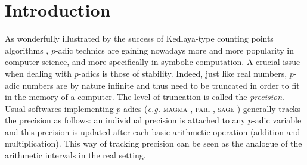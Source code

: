 \documentclass{article}
\begin{document}
\section{Introduction}

As wonderfully illustrated by the success of Kedlaya-type counting points 
algorithms \cite{kedlaya}, $p$-adic technics are gaining nowadays more and more 
popularity in computer science, and more specifically in symbolic 
computation. A crucial issue when dealing with $p$-adics is those of 
stability. Indeed, just like real numbers, $p$-adic numbers are by nature 
infinite and thus need to be truncated in order to fit in the memory of a 
computer. The level of truncation is called the \emph{precision}. Usual 
softwares implementing $p$-adics (\emph{e.g.} \textsc{magma} \cite{magma}, 
\textsc{pari} \cite{pari}, \textsc{sage} \cite{sage}) 
generally tracks the precision as follows: an individual precision is 
attached to any $p$-adic variable and this precision is updated after 
each basic arithmetic operation (addition and multiplication). This way 
of tracking precision can be seen as the analogue of the arithmetic 
intervals in the real setting.
\end{document}
